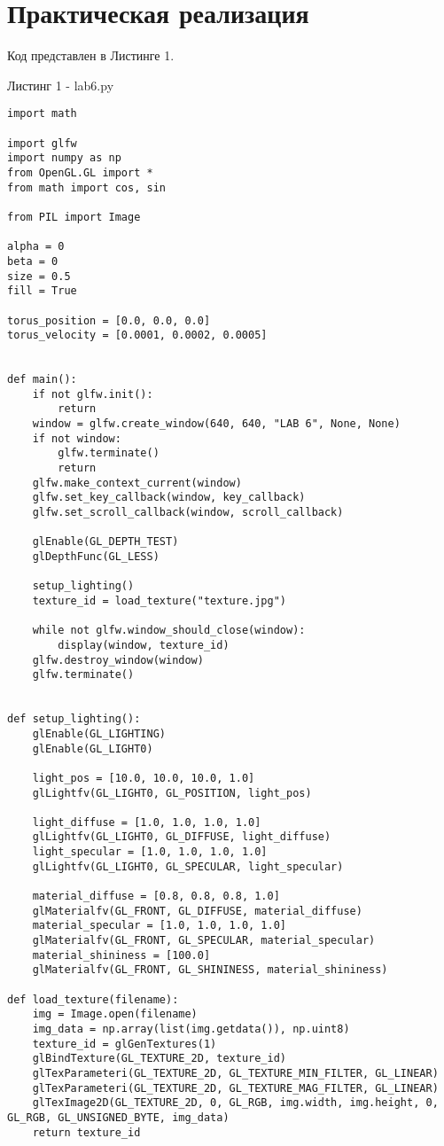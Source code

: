 \documentclass[a4paper, 14pt]{extarticle}
\begin{document}
\pagebreak
\section{Практическая реализация}
Код представлен в Листинге 1.
\par
\begin{center}
    Листинг 1 - lab6.py
\end{center}

\begin{lstlisting}
import math

import glfw
import numpy as np
from OpenGL.GL import *
from math import cos, sin

from PIL import Image

alpha = 0
beta = 0
size = 0.5
fill = True

torus_position = [0.0, 0.0, 0.0]
torus_velocity = [0.0001, 0.0002, 0.0005]


def main():
    if not glfw.init():
        return
    window = glfw.create_window(640, 640, "LAB 6", None, None)
    if not window:
        glfw.terminate()
        return
    glfw.make_context_current(window)
    glfw.set_key_callback(window, key_callback)
    glfw.set_scroll_callback(window, scroll_callback)

    glEnable(GL_DEPTH_TEST)
    glDepthFunc(GL_LESS)

    setup_lighting()
    texture_id = load_texture("texture.jpg")

    while not glfw.window_should_close(window):
        display(window, texture_id)
    glfw.destroy_window(window)
    glfw.terminate()


def setup_lighting():
    glEnable(GL_LIGHTING)
    glEnable(GL_LIGHT0)

    light_pos = [10.0, 10.0, 10.0, 1.0]
    glLightfv(GL_LIGHT0, GL_POSITION, light_pos)

    light_diffuse = [1.0, 1.0, 1.0, 1.0]
    glLightfv(GL_LIGHT0, GL_DIFFUSE, light_diffuse)
    light_specular = [1.0, 1.0, 1.0, 1.0]
    glLightfv(GL_LIGHT0, GL_SPECULAR, light_specular)

    material_diffuse = [0.8, 0.8, 0.8, 1.0]
    glMaterialfv(GL_FRONT, GL_DIFFUSE, material_diffuse)
    material_specular = [1.0, 1.0, 1.0, 1.0]
    glMaterialfv(GL_FRONT, GL_SPECULAR, material_specular)
    material_shininess = [100.0]
    glMaterialfv(GL_FRONT, GL_SHININESS, material_shininess)

def load_texture(filename):
    img = Image.open(filename)
    img_data = np.array(list(img.getdata()), np.uint8)
    texture_id = glGenTextures(1)
    glBindTexture(GL_TEXTURE_2D, texture_id)
    glTexParameteri(GL_TEXTURE_2D, GL_TEXTURE_MIN_FILTER, GL_LINEAR)
    glTexParameteri(GL_TEXTURE_2D, GL_TEXTURE_MAG_FILTER, GL_LINEAR)
    glTexImage2D(GL_TEXTURE_2D, 0, GL_RGB, img.width, img.height, 0, GL_RGB, GL_UNSIGNED_BYTE, img_data)
    return texture_id



\end{lstlisting}
\end{document}
